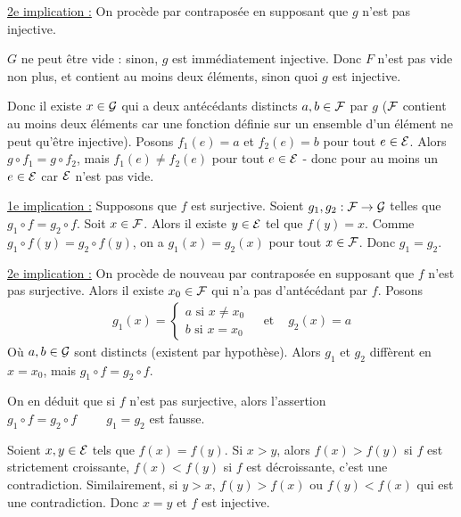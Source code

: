 \documentclass[]{../templates/homework}
\begin{document}
\underline{2e implication :} On procède par contraposée en supposant que $g$ n'est pas injective.

$G$ ne peut être vide : sinon, $g$ est immédiatement injective. Donc $F$ n'est pas vide non plus, et contient au moins deux éléments, sinon quoi $g$ est injective.

Donc il existe $x\in\mathcal G$ qui a deux antécédants distincts $a,b\in\mathcal F$ par $g$ ($\mathcal F$ contient au moins deux éléments car une fonction définie sur un ensemble d'un élément ne peut qu'être injective). Posons $f_{1}(e) = a$ et $f_{2}(e) = b$ pour tout $e\in\mathcal E$. Alors $g\circ f_{1} = g\circ f_{2}$, mais $f_{1}(e) \neq f_{2}(e)$ pour tout $e\in\mathcal E$ - donc pour au moins un $e\in\mathcal E$ car $\mathcal E$ n'est pas vide.

\question
\underline{1e implication :} Supposons que $f$ est surjective. Soient $g_{1},g_{2}: \mathcal F\rightarrow \mathcal G$ telles que $g_{1}\circ f = g_{2}\circ f$. Soit $x \in \mathcal F$. Alors il existe $y\in\mathcal E$ tel que $f(y) = x$. Comme $g_{1}\circ f(y) = g_{2}\circ f(y)$, on a $g_{1}(x) = g_{2}(x)$ pour tout $x\in\mathcal F$. Donc $g_{1} = g_{2}$.

\underline{2e implication :} On procède de nouveau par contraposée en supposant que $f$ n'est pas surjective. Alors il existe $x_{0}\in\mathcal F$ qui n'a pas d'antécédant par $f$. Posons
\begin{eqnarray}
  g_{1}(x) =
  \begin{cases}
    a \text{ si } x\neq x_{0} \\
    b \text{ si } x = x_{0}
  \end{cases}
  &\text{  et  }& g_{2}(x) = a
\end{eqnarray}
Où $a,b \in\mathcal G$ sont distincts (existent par hypothèse). Alors $g_{1}$ et $g_{2}$ diffèrent en $x=x_{0}$, mais $g_{1}\circ f = g_{2}\circ f$.

On en déduit que si $f$ n'est pas surjective, alors l'assertion $g_1 \circ f = g_2 \circ f \hspace{1cm} g_1 = g_2$ est fausse.

\newpage

\subproblem
Soient $x,y \in \mathcal E$ tels que $f(x) = f(y)$. Si $x>y$, alors $f(x) > f(y)$ si $f$ est strictement croissante, $f(x) < f(y)$ si $f$ est décroissante, c'est une contradiction. Similairement, si $y>x$, $f(y) > f(x)$ ou $f(y) < f(x)$ qui est une contradiction. Donc $x=y$ et $f$ est injective.
\end{document}
